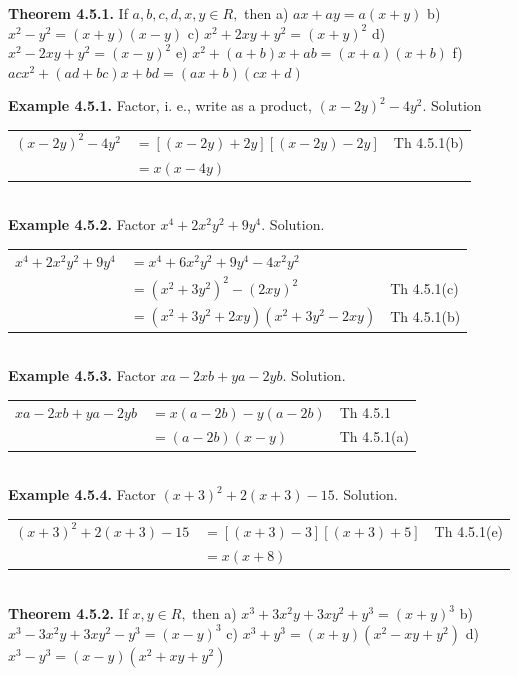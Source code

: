 \textbf{Theorem 4.5.1.} If $a,b,c,d,x,y\in R,$ then \nl
a) $ax + ay = a(x + y)$\nl
b) $x^{2} - y^{2} = (x + y)(x - y)$\nl
c) $x^{2} + 2xy + y^{2} = (x + y)^2$\nl
d) $x^{2} - 2xy + y^{2} = (x - y)^{2}$\nl
e) $x^{2} + (a + b)x + ab =(x + a)(x + b)$\nl
f) $acx^{2} + (ad + bc)x + bd = (ax + b)(cx + d) $\nl

\newpage

\textbf{Example 4.5.1.}  Factor, i. e., write as a product, $(x - 2y)^{2} - 4y^{2}.$\nl
Solution\nl
\begin{tabular}{r l l}
$(x - 2y)^{2} - 4y^{2}$&$=[(x - 2y) + 2y][(x - 2y) - 2y]$&Th 4.5.1(b)\\
& $= x(x -4y)$&\\
\end{tabular}\\

\textbf{Example 4.5.2.} Factor $x^{4} + 2x^{2}y^{2}  + 9y^{4}.$ \nl
Solution.\nl
\begin{tabular}{r l l}
$x^{4} + 2x^{2}y^{2}  + 9y^{4}$&$=x^{4} + 6x^{2}y^{2} + 9y^{4} - 4x^{2}y^{2} $&\\
&$=(x^{2} + 3y^{2})^{2} -(2xy)^{2}$&Th 4.5.1(c)\\
&$=(x^{2} + 3y^{2} + 2xy)(x^{2} + 3y^{2} - 2xy)$&Th 4.5.1(b)\\
\end{tabular}\\

\textbf{Example 4.5.3.} Factor $xa - 2xb + ya - 2yb.$\nl
Solution.\nl
\begin{tabular}{r l l}
$xa - 2xb + ya - 2yb$&$=x(a - 2b) - y(a - 2b)$&Th 4.5.1\\
&$=(a - 2b)(x - y)$&Th 4.5.1(a)\\
\end{tabular}\\

\textbf{Example 4.5.4.} Factor $(x+3)^{2} + 2(x+3) - 15.$\nl
Solution.\nl
\begin{tabular}{r l l}
$(x+3)^{2} + 2(x+3) - 15$&$= [(x+3)-3] [(x+3)+5]$&Th 4.5.1(e)\\
&$=x(x + 8)$&\\
\end{tabular} \\

\textbf{Theorem 4.5.2.} If $x,y\in R,$ then \nl
a) $x^{3} + 3x^{2}y + 3xy^2 + y^{3} = (x + y)^{3}$\nl
b) $x^{3} - 3x^{2}y + 3xy^2 - y^{3} = (x - y)^{3}$\nl
c) $x^{3} + y^{3} =(x + y)(x^{2}  - xy + y^{2})$\nl
d) $x^{3} - y^{3} =(x - y)(x^{2}  + xy + y^{2})$\nl


